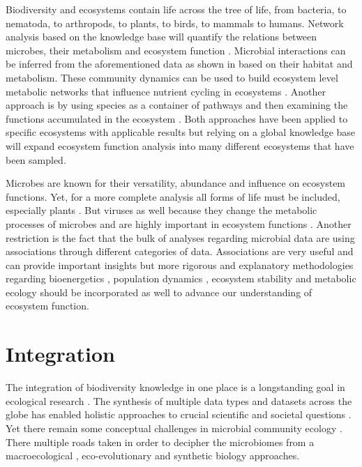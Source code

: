 Biodiversity and ecosystems contain life across the tree of life, from
bacteria, to nematoda, to arthropods, to plants, to birds, to mammals to 
humans. Network analysis based on the knowledge base will quantify the relations
between microbes, their metabolism and ecosystem
function \parencite{graham2016Microbes,muller2018Using, perez_garcia2016Metabolic}.
Microbial interactions can be inferred from the aforementioned data as shown
in \parencite{machado2021Polarization} based on their habitat and metabolism.
These community dynamics can be used to build ecosystem level metabolic
networks \parencite{perez_garcia2016Metabolic} that influence nutrient cycling in
ecosystems \parencite{bauer2018Network}. Another approach is by using species as a
container of pathways and then examining the functions accumulated in the
ecosystem \parencite{loucaDecouplingFunctionTaxonomy2016}. Both approaches have
been applied to specific ecosystems with applicable results but relying on a
global knowledge base will expand ecosystem function analysis into many
different ecosystems that have been sampled.

Microbes are known for their versatility, abundance and influence on ecosystem
functions. Yet, for a more complete analysis all forms of life must be included,
especially plants \parencite{thompson2012Food}. But viruses as well because they
change the metabolic processes of microbes and are highly important in
ecosystem functions \parencite{hurwitz2016Viral}. Another restriction is the fact
that the bulk of analyses regarding microbial data are using associations
through different categories of data. Associations are very useful and can
provide important insights but more rigorous and explanatory methodologies
regarding bioenergetics \parencite{kempes2012Growth}, population dynamics
\parencite{gonze2018Microbial}, ecosystem stability \parencite{berdugo2020Global} and
metabolic ecology \parencite{brown2004METABOLIC} should be incorporated as well to
advance our understanding of ecosystem function.

\section{Integration}
\label{sec:integration}

The integration of biodiversity knowledge in one place is a longstanding
goal in ecological research \parencite{Walter_2012}. The synthesis of multiple
data types and datasets across the globe has enabled 
holistic approaches to crucial scientific and societal questions \parencite{heberling_j_mason_data_2021}.
Yet there remain some conceptual challenges in microbial community ecology \parencite{prosser2020Conceptual}.
There multiple roads taken in order to decipher the microbiomes from a macroecological \parencite{Mascarenhas2020}, 
eco-evolutionary \parencite{martiny2023Investigating, loreau2023Opportunities} and synthetic biology \parencite{Leggieri2021} approaches.

